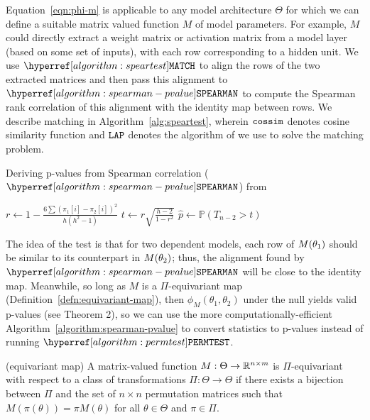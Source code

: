 Equation~\eqref{eqn:phi-m} is applicable to any model architecture $\Theta$ for which we can define a suitable matrix valued function $M$ of model parameters. For example, $M$ could directly extract a weight matrix or activation matrix from a model layer (based on some set of inputs), with each row corresponding to a hidden unit. We use $\speartest$ to align the rows of the two extracted matrices and then pass this alignment to $\spearman$ to compute the Spearman rank correlation \citep{spearmanrank} of this alignment with the identity map between rows.
We describe matching in Algorithm~\ref{alg:speartest}, wherein $\mathtt{cossim}$ denotes cosine similarity function and $\mathtt{LAP}$ denotes the algorithm of \citet{Ramshaw2012OnMA} we use to solve the matching problem. 

\begin{algorithm}[h]\label{alg:spearman-pvalue}
    \DontPrintSemicolon
    \caption{Deriving p-values from Spearman correlation ($\spearman$) from \cite{spearmanrank}}
    \label{algorithm:spearman-pvalue}
    \KwOut{p-value $\hat p \in (0,1]$}
    $r \gets 1 - \frac{6 \sum (\pi_1[i] - \pi_2[i])^2}{h(h^2-1)}$\; 
    $t \gets r \sqrt{\frac{h-2}{1-r^2}}$\;
    $\hat p \gets \mathbb{P}(T_{n-2} > t)$ \; 
\end{algorithm}

The idea of the test is that for two dependent models, each row of $M(\theta_1)$ should be similar to its counterpart in $M(\theta_2)$; thus, the alignment found by $\spearman$ will be close to the identity map.
Meanwhile, so long as $M$ is a $\Pi$-equivariant map (Definition~\ref{defn:equivariant-map}), then $\phi_M(\theta_1,\theta_2)$ under the null yields valid p-values (see Theorem 2), 
so we can use the more computationally-efficient Algorithm~\ref{algorithm:spearman-pvalue} to convert statistics to p-values instead of running $\permtest$.

\begin{definition}\label{defn:equivariant-map}
    (equivariant map) A matrix-valued function $M : \Theta \to \mathbb{R}^{n \times m}$ is $\Pi$-equivariant with respect to a class of transformations $\Pi : \Theta \to \Theta$ if there exists a bijection between $\Pi$ and the set of $n \times n$ permutation matrices such that $M(\pi(\theta)) = \pi M(\theta)$ for all $\theta \in \Theta$ and $\pi \in \Pi$.
\end{definition}

